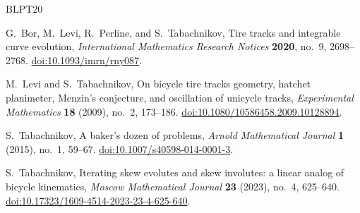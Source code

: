\begin{thebibliography}{BLPT20}
\raggedright

G.~Bor, M.~Levi, R.~Perline, and S.~Tabachnikov,
\newblock Tire tracks and integrable curve evolution,
\newblock \emph{International Mathematics Research Notices}
\textbf{2020}, no.~9, 2698--2768.
\newblock \href{https://doi.org/10.1093/imrn/rny087}{doi:10.1093/imrn/rny087}.

M.~Levi and S.~Tabachnikov,
\newblock On bicycle tire tracks geometry, hatchet planimeter, Menzin's
conjecture, and oscillation of unicycle tracks,
\newblock \emph{Experimental Mathematics} \textbf{18} (2009), no.~2,
173--186.
\newblock \href{https://doi.org/10.1080/10586458.2009.10128894}
{doi:10.1080/10586458.2009.10128894}.

S.~Tabachnikov,
\newblock A baker's dozen of problems,
\newblock \emph{Arnold Mathematical Journal} \textbf{1} (2015), no.~1,
59--67.
\newblock \href{https://doi.org/10.1007/s40598-014-0001-3}
{doi:10.1007/s40598-014-0001-3}.

S.~Tabachnikov,
\newblock Iterating skew evolutes and skew involutes: a linear analog of
bicycle kinematics,
\newblock \emph{Moscow Mathematical Journal} \textbf{23} (2023), no.~4,
625--640.
\newblock \href{https://doi.org/10.17323/1609-4514-2023-23-4-625-640}
{\mbox{doi:10.17323/1609-4514-2023-23-4-625-640}}.

\end{thebibliography}
